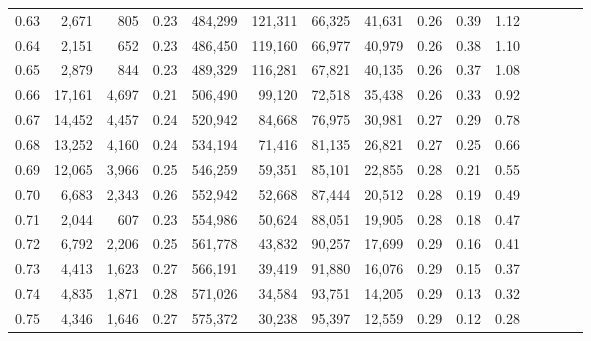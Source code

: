 \begin{tabular}{rrrcrrrrrrrrrrr}
0.63 &   2,671 &    805 &                                       0.23 &  484,299 &  121,311 &   66,325 &   41,631 &  0.26 &  0.39 &                         1.12 \\
0.64 &   2,151 &    652 &                                       0.23 &  486,450 &  119,160 &   66,977 &   40,979 &  0.26 &  0.38 &                         1.10 \\
0.65 &   2,879 &    844 &                                       0.23 &  489,329 &  116,281 &   67,821 &   40,135 &  0.26 &  0.37 &                         1.08 \\
0.66 &  17,161 &  4,697 &                                       0.21 &  506,490 &   99,120 &   72,518 &   35,438 &  0.26 &  0.33 &                         0.92 \\
0.67 &  14,452 &  4,457 &                                       0.24 &  520,942 &   84,668 &   76,975 &   30,981 &  0.27 &  0.29 &                         0.78 \\
0.68 &  13,252 &  4,160 &                                       0.24 &  534,194 &   71,416 &   81,135 &   26,821 &  0.27 &  0.25 &                         0.66 \\
0.69 &  12,065 &  3,966 &                                       0.25 &  546,259 &   59,351 &   85,101 &   22,855 &  0.28 &  0.21 &                         0.55 \\
0.70 &   6,683 &  2,343 &                                       0.26 &  552,942 &   52,668 &   87,444 &   20,512 &  0.28 &  0.19 &                         0.49 \\
0.71 &   2,044 &    607 &                                       0.23 &  554,986 &   50,624 &   88,051 &   19,905 &  0.28 &  0.18 &                         0.47 \\
0.72 &   6,792 &  2,206 &                                       0.25 &  561,778 &   43,832 &   90,257 &   17,699 &  0.29 &  0.16 &                         0.41 \\
0.73 &   4,413 &  1,623 &                                       0.27 &  566,191 &   39,419 &   91,880 &   16,076 &  0.29 &  0.15 &                         0.37 \\
0.74 &   4,835 &  1,871 &                                       0.28 &  571,026 &   34,584 &   93,751 &   14,205 &  0.29 &  0.13 &                         0.32 \\
0.75 &   4,346 &  1,646 &                                       0.27 &  575,372 &   30,238 &   95,397 &   12,559 &  0.29 &  0.12 &                         0.28 \\

\end{tabular}

